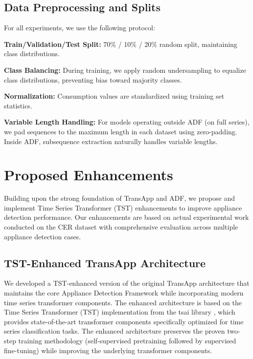 \documentclass[conference]{IEEEtran}
\begin{document}
\subsection{Data Preprocessing and Splits}

For all experiments, we use the following protocol:

\textbf{Train/Validation/Test Split:} 70\% / 10\% / 20\% random split, maintaining class distributions.

\textbf{Class Balancing:} During training, we apply random undersampling to equalize class distributions, preventing bias toward majority classes.

\textbf{Normalization:} Consumption values are standardized using training set statistics.

\textbf{Variable Length Handling:} For models operating outside ADF (on full series), we pad sequences to the maximum length in each dataset using zero-padding. Inside ADF, subsequence extraction naturally handles variable lengths.

\section{Proposed Enhancements}
\label{sec:proposed}

Building upon the strong foundation of TransApp and ADF, we propose and implement Time Series Transformer (TST) enhancements to improve appliance detection performance. Our enhancements are based on actual experimental work conducted on the CER dataset with comprehensive evaluation across multiple appliance detection cases.

\subsection{TST-Enhanced TransApp Architecture}

We developed a TST-enhanced version of the original TransApp architecture that maintains the core Appliance Detection Framework while incorporating modern time series transformer components. The enhanced architecture is based on the Time Series Transformer (TST) implementation from the tsai library \cite{tsai2022, tst2022tsai}, which provides state-of-the-art transformer components specifically optimized for time series classification tasks. The enhanced architecture preserves the proven two-step training methodology (self-supervised pretraining followed by supervised fine-tuning) while improving the underlying transformer components.
\end{document}
